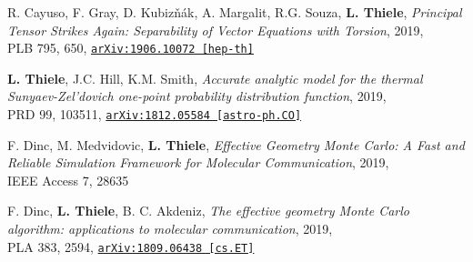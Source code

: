 R. Cayuso, F. Gray, D. Kubiz\v{n}\'{a}k, A. Margalit, R.G. Souza, {\bf L. Thiele},
\emph{Principal Tensor Strikes Again: Separability of Vector Equations with Torsion}, 2019,\\
PLB 795, 650,
\href{https://arxiv.org/abs/1906.10072}{\mbox{\texttt{arXiv:1906.10072 [hep-th]}}}

{\bf L. Thiele}, J.C. Hill, K.M. Smith, \emph{Accurate analytic model for the thermal
Sunyaev-Zel'dovich one-point probability distribution function}, 2019,\\
PRD 99, 103511,
\href{https://arxiv.org/abs/1812.05584}{\mbox{\texttt{arXiv:1812.05584 [astro-ph.CO]}}}

F. Dinc, M. Medvidovic, {\bf L. Thiele}, \emph{Effective Geometry Monte Carlo: A Fast and
Reliable Simulation Framework for Molecular Communication}, 2019,\\
IEEE Access 7, 28635

\newpage
\vspace*{0.5cm}

F. Dinc, {\bf L. Thiele}, B. C. Akdeniz, \emph{The effective geometry Monte Carlo
algorithm: applications to molecular communication}, 2019,\\
PLA 383, 2594,
\href{https://arxiv.org/abs/1809.06438}{\mbox{\texttt{arXiv:1809.06438 [cs.ET]}}}
